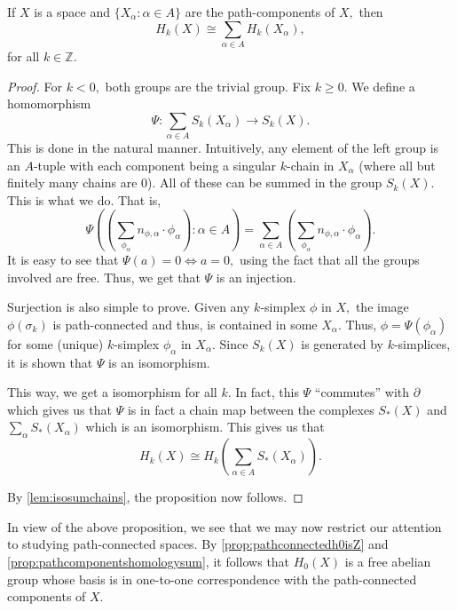 \documentclass[12pt]{article}
\begin{document}
\begin{prop} \label{prop:pathcomponentshomologysum}
	If $X$ is a space and $\{X_\alpha : \alpha \in A\}$ are the path-components of $X,$ then
	\begin{equation*} 
		H_k(X) \cong \sum_{\alpha \in A} H_k(X_\alpha),
	\end{equation*}
	for all $k \in \mathbb{Z}.$
\end{prop}
\begin{proof} 
	For $k < 0,$ both groups are the trivial group. Fix $k \ge 0.$ We define a homomorphism
	\begin{equation*} 
		\Psi:\sum_{\alpha \in A} S_k(X_\alpha) \to S_k(X).
	\end{equation*}
	This is done in the natural manner. Intuitively, any element of the left group is an $A$-tuple with each component being a singular $k$-chain in $X_\alpha$ (where all but finitely many chains are $0$). All of these can be summed in the group $S_k(X).$ This is what we do. That is,
	\begin{equation*} 
		\Psi\left(\left(\sum_{\phi_\alpha}n_{\phi, \alpha}\cdot\phi_\alpha\right) : \alpha \in A\right) = \sum_{\alpha \in A} \left(\sum_{\phi_\alpha}n_{\phi, \alpha}\cdot\phi_\alpha\right).
	\end{equation*}
	It is easy to see that $\Psi(a) = 0 \iff a = 0,$ using the fact that all the groups involved are free. Thus, we get that $\Psi$ is an injection. 

	Surjection is also simple to prove. Given any $k$-simplex $\phi$ in $X,$ the image $\phi(\sigma_k)$ is path-connected and thus, is contained in some $X_\alpha.$ Thus, $\phi = \Psi(\phi_\alpha)$ for some (unique) $k$-simplex $\phi_\alpha$ in $X_\alpha.$ Since $S_k(X)$ is generated by $k$-simplices, it is shown that $\Psi$ is an isomorphism.

	This way, we get a isomorphism for all $k.$ In fact, this $\Psi$ ``commutes'' with $\partial$ which gives us that $\Psi$ is in fact a chain map between the complexes $S_*(X)$ and $\sum_\alpha S_*(X_\alpha)$ which is an isomorphism. This gives us that
	\begin{equation*} 
		H_k(X) \cong H_k\left(\sum_{\alpha \in A} S_*(X_\alpha)\right).
	\end{equation*}

	By \cref{lem:isosumchains}, the proposition now follows.
\end{proof}

In view of the above proposition, we see that we may now restrict our attention to studying path-connected spaces. By \cref{prop:pathconnectedh0isZ} and \cref{prop:pathcomponentshomologysum}, it follows that $H_0(X)$ is a free abelian group whose basis is in one-to-one correspondence with the path-connected components of $X.$
\end{document}
